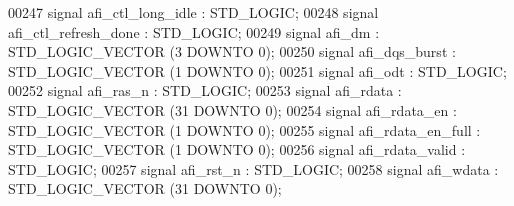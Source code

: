 \begin{DoxyCode}
00247                 \textcolor{keywordflow}{signal} \textcolor{vhdlchar}{afi_ctl_long_idle} \textcolor{vhdlchar}{:}  \textcolor{comment}{STD\_LOGIC};
00248                 \textcolor{keywordflow}{signal} \textcolor{vhdlchar}{afi_ctl_refresh_done} \textcolor{vhdlchar}{:}  \textcolor{comment}{STD\_LOGIC};
00249                 \textcolor{keywordflow}{signal} \textcolor{vhdlchar}{afi_dm} \textcolor{vhdlchar}{:}  \textcolor{comment}{STD\_LOGIC\_VECTOR} \textcolor{vhdlchar}{(}\textcolor{vhdllogic}{}\textcolor{vhdllogic}{3} \textcolor{keywordflow}{DOWNTO} \textcolor{vhdllogic}{}\textcolor{vhdllogic}{0}\textcolor{vhdlchar}{)};
00250                 \textcolor{keywordflow}{signal} \textcolor{vhdlchar}{afi_dqs_burst} \textcolor{vhdlchar}{:}  \textcolor{comment}{STD\_LOGIC\_VECTOR} \textcolor{vhdlchar}{(}\textcolor{vhdllogic}{}\textcolor{vhdllogic}{1} \textcolor{keywordflow}{DOWNTO} \textcolor{vhdllogic}{}\textcolor{vhdllogic}{0}\textcolor{vhdlchar}{)};
00251                 \textcolor{keywordflow}{signal} \textcolor{vhdlchar}{afi_odt} \textcolor{vhdlchar}{:}  \textcolor{comment}{STD\_LOGIC};
00252                 \textcolor{keywordflow}{signal} \textcolor{vhdlchar}{afi_ras_n} \textcolor{vhdlchar}{:}  \textcolor{comment}{STD\_LOGIC};
00253                 \textcolor{keywordflow}{signal} \textcolor{vhdlchar}{afi_rdata} \textcolor{vhdlchar}{:}  \textcolor{comment}{STD\_LOGIC\_VECTOR} \textcolor{vhdlchar}{(}\textcolor{vhdllogic}{}\textcolor{vhdllogic}{31} \textcolor{keywordflow}{DOWNTO} \textcolor{vhdllogic}{}\textcolor{vhdllogic}{0}\textcolor{vhdlchar}{)};
00254                 \textcolor{keywordflow}{signal} \textcolor{vhdlchar}{afi_rdata_en} \textcolor{vhdlchar}{:}  \textcolor{comment}{STD\_LOGIC\_VECTOR} \textcolor{vhdlchar}{(}\textcolor{vhdllogic}{}\textcolor{vhdllogic}{1} \textcolor{keywordflow}{DOWNTO} \textcolor{vhdllogic}{}\textcolor{vhdllogic}{0}\textcolor{vhdlchar}{)};
00255                 \textcolor{keywordflow}{signal} \textcolor{vhdlchar}{afi_rdata_en_full} \textcolor{vhdlchar}{:}  \textcolor{comment}{STD\_LOGIC\_VECTOR} \textcolor{vhdlchar}{(}\textcolor{vhdllogic}{}\textcolor{vhdllogic}{1} \textcolor{keywordflow}{DOWNTO} \textcolor{vhdllogic}{}\textcolor{vhdllogic}{0}\textcolor{vhdlchar}{)};
00256                 \textcolor{keywordflow}{signal} \textcolor{vhdlchar}{afi_rdata_valid} \textcolor{vhdlchar}{:}  \textcolor{comment}{STD\_LOGIC};
00257                 \textcolor{keywordflow}{signal} \textcolor{vhdlchar}{afi_rst_n} \textcolor{vhdlchar}{:}  \textcolor{comment}{STD\_LOGIC};
00258                 \textcolor{keywordflow}{signal} \textcolor{vhdlchar}{afi_wdata} \textcolor{vhdlchar}{:}  \textcolor{comment}{STD\_LOGIC\_VECTOR} \textcolor{vhdlchar}{(}\textcolor{vhdllogic}{}\textcolor{vhdllogic}{31} \textcolor{keywordflow}{DOWNTO} \textcolor{vhdllogic}{}\textcolor{vhdllogic}{0}\textcolor{vhdlchar}{)};

\end{DoxyCode}
